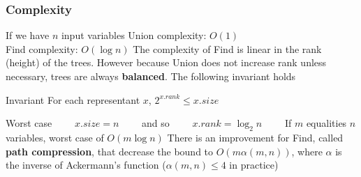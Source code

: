 \begin{frame}
  \frametitle{Complexity}

  \scriptsize

  If we have $n$ input variables\vfill
  Union complexity: \pause $O(1)$ \\ \pause
  Find complexity: $O(\log n)$ \pause
  \vfill
  The complexity of Find is linear in the rank (height) of the trees. 
  However because Union does not increase rank unless necessary, 
  trees are always {\bf balanced}. The following invariant holds
  \begin{exampleblock}{Invariant}
    For each representant $x$, $2^{x.rank} \leq x.size$ 
  \end{exampleblock} 
  Worst case $\quad\quad x.size = n\quad\quad$ and so $\quad\quad x.rank = \log_2 n\quad\quad$ 
  \vfill\pause
  If $m$ equalities $n$ variables, worst case of $O(m\log n)$
  \vfill
  There is an improvement for Find, called {\bf path compression},
  that decrease the bound to $O(m\alpha(m,n))$, where $\alpha$ is
  the inverse of Ackermann's function ($\alpha(m,n) \leq 4$ in practice)

\end{frame}

